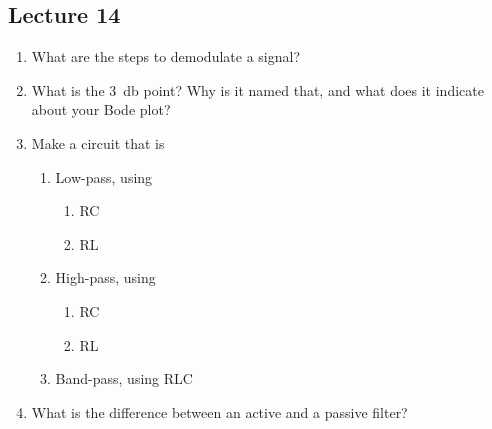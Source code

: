 \subsection*{Lecture 14}
\begin{enumerate}
  \item What are the steps to demodulate a signal?
  \item What is the \SI{3}{\decibel} point? 
  Why is it named that, and what does it indicate about your Bode plot?
  \item Make a circuit that is
  \begin{enumerate}
    \item Low-pass, using
    \begin{enumerate}
      \item RC
      \item RL
    \end{enumerate}
    \item High-pass, using
    \begin{enumerate}
      \item RC
      \item RL
    \end{enumerate}
    \item Band-pass, using RLC
  \end{enumerate}
  \item What is the difference between an active and a passive filter?
\end{enumerate}